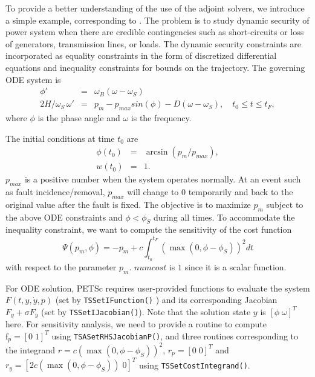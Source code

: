 To provide a better understanding of the use of the adjoint solvers, we introduce a simple example, corresponding to \href{http://www.mcs.anl.gov/petsc/petsc-current/src/ts/examples/tutorials/power_grid/ex3adj.c.html}{}.
The problem is to study dynamic security of power system when there are credible contingencies such as short-circuits or loss of generators, transmission lines, or loads.
The dynamic security constraints are incorporated as equality constraints in the form of discretized differential equations and inequality constraints for bounds on the trajectory.
The governing ODE system is
\begin{eqnarray*}
    \phi' &= &\omega_B (\omega - \omega_S)  \\
    2H/\omega_S \, \omega' & =& p_m - p_{max} sin(\phi) -D (\omega - \omega_S), \quad t_0 \leq t \leq t_F,
\end{eqnarray*}
where $\phi$ is the phase angle and $\omega$ is the frequency.

The initial conditions at time $t_0$ are
%
\begin{eqnarray*}
\phi(t_0) &=& \arcsin \left( p_m / p_{max} \right), \\
w(t_0) & =& 1.
\end{eqnarray*}
%
$p_{max}$ is a positive number when the system operates normally. At an event such as fault incidence/removal, $p_{max}$ will change to $0$ temporarily and back to the original value after the fault is fixed.
The objective is to maximize $p_m$ subject to the above ODE constraints and $\phi<\phi_S$ during all times.
To accommodate the inequality constraint, we want to compute the sensitivity of the cost function
%
\[
\Psi(p_m,\phi) = -p_m + c \int_{t_0}^{t_F} \left( \max(0, \phi - \phi_S ) \right)^2 dt
\]
%
with respect to the parameter $p_m$. $numcost$ is $1$ since it is a scalar function.

For ODE solution, PETSc requires user-provided functions to evaluate the system $F(t,y,\dot{y},p)$ (set by \lstinline{TSSetIFunction()} )
and its corresponding Jacobian $F_y + \sigma F_{\dot y}$ (set by \lstinline{TSSetIJacobian()}).
Note that the solution state $y$ is $[ \phi \;  \omega ]^T$ here.
For sensitivity analysis, we need to provide a routine to compute $\mathrm{f}_p=[0 \; 1]^T$ using \lstinline{TSASetRHSJacobianP()},
and three routines corresponding to the integrand $r=c \left( \max(0, \phi - \phi_S ) \right)^2$, $r_p = [0 \; 0]^T$ and $r_y= [ 2 c \left( \max(0, \phi - \phi_S ) \right) \; 0]^T$ using \lstinline{TSSetCostIntegrand()}.


